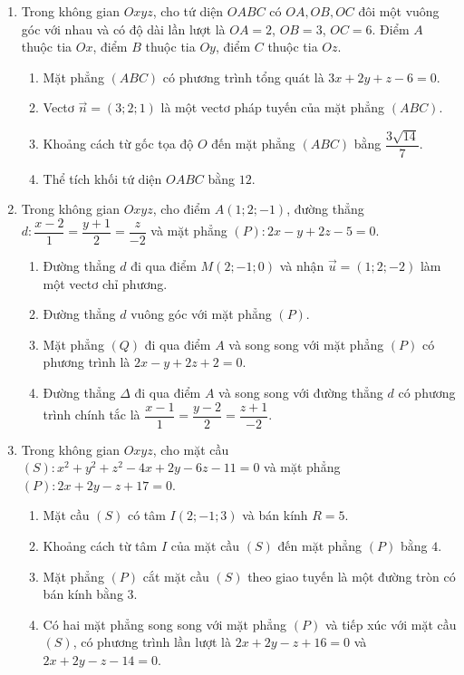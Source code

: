 \documentclass[12pt,a4paper]{article}
\begin{document}
\begin{enumerate}
\needspace{6cm}
\item Trong không gian $Oxyz$, cho tứ diện $OABC$ có $OA, OB, OC$ đôi một vuông góc với nhau và có độ dài lần lượt là $OA = 2$, $OB = 3$, $OC = 6$. Điểm $A$ thuộc tia $Ox$, điểm $B$ thuộc tia $Oy$, điểm $C$ thuộc tia $Oz$.
\begin{enumerate}[label=\alph*),leftmargin=*,itemsep=3pt]
    \item Mặt phẳng $(ABC)$ có phương trình tổng quát là $3x + 2y + z - 6 = 0$.
    \item Vectơ $\vec{n} = (3; 2; 1)$ là một vectơ pháp tuyến của mặt phẳng $(ABC)$.
    \item Khoảng cách từ gốc tọa độ $O$ đến mặt phẳng $(ABC)$ bằng $\dfrac{3\sqrt{14}}{7}$.
    \item Thể tích khối tứ diện $OABC$ bằng $12$.
\end{enumerate}

\needspace{6.5cm}
\item Trong không gian $Oxyz$, cho điểm $A(1; 2; -1)$, đường thẳng $d: \dfrac{x-2}{1} = \dfrac{y+1}{2} = \dfrac{z}{-2}$ và mặt phẳng $(P): 2x - y + 2z - 5 = 0$.
\begin{enumerate}[label=\alph*),leftmargin=*,itemsep=3pt]
    \item Đường thẳng $d$ đi qua điểm $M(2; -1; 0)$ và nhận $\vec{u} = (1; 2; -2)$ làm một vectơ chỉ phương.
    \item Đường thẳng $d$ vuông góc với mặt phẳng $(P)$.
    \item Mặt phẳng $(Q)$ đi qua điểm $A$ và song song với mặt phẳng $(P)$ có phương trình là $2x - y + 2z + 2 = 0$.
    \item Đường thẳng $\Delta$ đi qua điểm $A$ và song song với đường thẳng $d$ có phương trình chính tắc là $\dfrac{x-1}{1} = \dfrac{y-2}{2} = \dfrac{z+1}{-2}$.
\end{enumerate}

\needspace{6.5cm}
\item Trong không gian $Oxyz$, cho mặt cầu $(S): x^2 + y^2 + z^2 - 4x + 2y - 6z - 11 = 0$ và mặt phẳng $(P): 2x + 2y - z + 17 = 0$.
\begin{enumerate}[label=\alph*),leftmargin=*,itemsep=3pt]
    \item Mặt cầu $(S)$ có tâm $I(2; -1; 3)$ và bán kính $R = 5$.
    \item Khoảng cách từ tâm $I$ của mặt cầu $(S)$ đến mặt phẳng $(P)$ bằng $4$.
    \item Mặt phẳng $(P)$ cắt mặt cầu $(S)$ theo giao tuyến là một đường tròn có bán kính bằng $3$.
    \item Có hai mặt phẳng song song với mặt phẳng $(P)$ và tiếp xúc với mặt cầu $(S)$, có phương trình lần lượt là $2x + 2y - z + 16 = 0$ và $2x + 2y - z - 14 = 0$.
\end{enumerate}


\end{enumerate}
\end{document}

